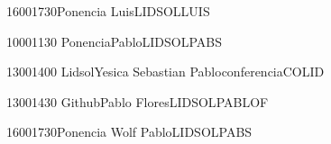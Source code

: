 \documentclass[a4paper,10pt]{report}
\begin{document}
\begin{landscape}
\begin{timetable}
    {1600}{1730}{Ponencia }{Luis}{{\tiny LIDSOL}}{LUIS}
   
 
   
   
   
   
   
   
    {1000}{1130}{ Ponencia}{Pablo}{{\tiny LIDSOL}}{PABS}
   
     {1300}{1400}{ Lidsol}{Yesica Sebastian Pablo}{{\tiny conferencia}}{COLID}
   
  
   
   
   
  
    {1300}{1430}{  Github}{Pablo Flores}{{\tiny LIDSOL}}{PABLOF}
   
       {1600}{1730}{Ponencia Wolf }{Pablo}{{\tiny LIDSOL}}{PABS}
    
   


 
 
   
     
   
   
   
  
   
  
  
    
   
 \end{timetable}
 \end{landscape}
 
\end{document}
